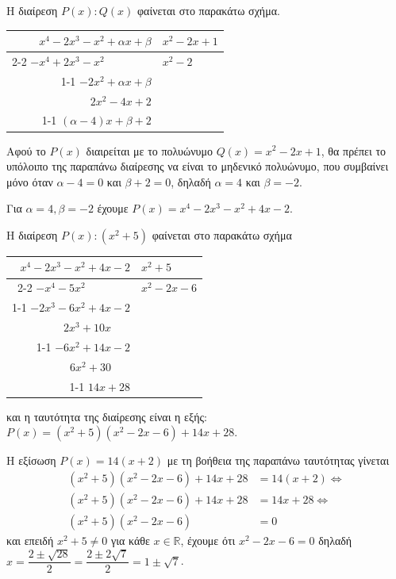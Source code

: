 \documentclass[11pt,a4paper,twoside]{book}
\begin{document}
\begin{alist}
\item Η διαίρεση $P(x) : Q(x)$ φαίνεται στο παρακάτω σχήμα.
\begin{center}
\begin{tabular}{r|l}
$x^4 - 2x^3 - x^2 + \alpha x + \beta$ & $x^2 - 2x + 1$ \\ \cline{2-2}
$-x^4 + 2x^3 - x^2 \phantom{{} + \alpha x + \beta}$ & $x^2 - 2$ \\ \cline{1-1}
$-2x^2 + \alpha x + \beta$ & \\
$2x^2 - 4x + 2$ & \\ \cline{1-1}
$(\alpha - 4)x + \beta + 2$ &
\end{tabular}
\end{center}
Αφού το $P(x)$ διαιρείται με το πολυώνυμο $Q(x) = x^2 - 2x + 1$, θα πρέπει το υπόλοιπο της παραπάνω διαίρεσης να είναι το μηδενικό πολυώνυμο, που συμβαίνει μόνο όταν $\alpha - 4 = 0$ και $\beta + 2 = 0$, δηλαδή $\alpha = 4$ και $\beta = -2$.
\item Για $\alpha = 4, \beta = -2$ έχουμε $P(x) = x^4 - 2x^3 - x^2 + 4x - 2$.
\begin{rlist}
\item Η διαίρεση $P(x) : (x^2 + 5)$ φαίνεται στο παρακάτω σχήμα
\begin{center}
\begin{tabular}{r|l}
$x^4 - 2x^3 - x^2 + 4x - 2$ & $x^2 + 5$ \\ \cline{2-2}
$-x^4 - 5x^2 \phantom{{} + 4x - 2}$ & $x^2 - 2x - 6$ \\ \cline{1-1}
$-2x^3 - 6x^2 + 4x - 2$ & \\
$2x^3 + 10x \phantom{{} - 2}$ & \\ \cline{1-1}
$-6x^2 + 14x - 2$ & \\
$6x^2 + 30 \phantom{{} - 2}$ & \\ \cline{1-1}
$14x + 28$ &
\end{tabular}
\end{center}
και η ταυτότητα της διαίρεσης είναι η εξής: $P(x) = (x^2 + 5)(x^2 - 2x - 6) + 14x + 28$.
\item Η εξίσωση $P(x) = 14(x + 2)$ με τη βοήθεια της παραπάνω ταυτότητας γίνεται
\begin{align*}
(x^2 + 5)(x^2 - 2x - 6) + 14x + 28 &= 14(x + 2) \Leftrightarrow \\
(x^2 + 5)(x^2 - 2x - 6) + 14x + 28 &= 14x + 28 \Leftrightarrow \\
(x^2 + 5)(x^2 - 2x - 6) &= 0
\end{align*}
και επειδή $x^2 + 5 \ne 0$ για κάθε $x \in \mathbb{R}$, έχουμε ότι $x^2 - 2x - 6 = 0$ δηλαδή $x = \dfrac{2 \pm \sqrt{28}}{2} = \dfrac{2 \pm 2\sqrt{7}}{2} = 1 \pm \sqrt{7}$.
\end{rlist}
\end{alist}
\end{document}
